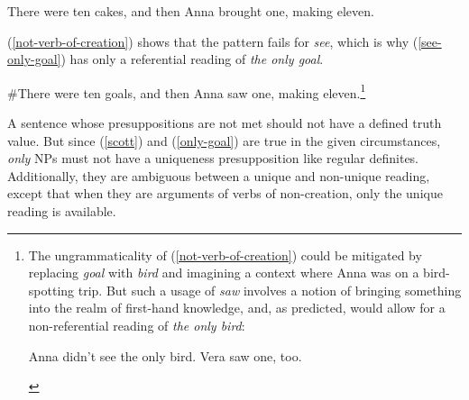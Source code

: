 \begin{exe}
	\ex \label{verb-of-creation} There were ten cakes, and then Anna brought one, making eleven.
\end{exe}
	
(\ref{not-verb-of-creation}) shows that the pattern fails for \textit{see}, which is why (\ref{see-only-goal}) has only a referential reading of \textit{the only goal}.

\begin{exe}
	\ex \label{not-verb-of-creation} \#There were ten goals, and then Anna saw one, making eleven.\footnote{The ungrammaticality of (\ref{not-verb-of-creation}) could be mitigated by replacing \textit{goal} with \textit{bird} and imagining a context where Anna was on a bird-spotting trip. But such a usage of \textit{saw} involves a notion of bringing something into the realm of first-hand knowledge, and, as predicted, would allow for a non-referential reading of \textit{the only bird}: \begin{exe} \ex Anna didn't see the only bird. Vera saw one, too. \end{exe} }
\end{exe}

A sentence whose presuppositions are not met should not have a defined truth value. But since (\ref{scott}) and (\ref{only-goal}) are true in the given circumstances, \textit{only} NPs must not have a uniqueness presupposition like regular definites. Additionally, they are ambiguous between a unique and non-unique reading, except that when they are arguments of verbs of non-creation, only the unique reading is available.